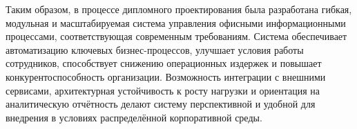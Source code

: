 Таким образом, в процессе дипломного проектирования была разработана гибкая, модульная и масштабируемая система управления офисными информационными процессами, соответствующая современным требованиям. Система обеспечивает автоматизацию ключевых бизнес-процессов, улучшает условия работы сотрудников, способствует снижению операционных издержек и повышает конкурентоспособность организации. Возможность интеграции с внешними сервисами, архитектурная устойчивость к росту нагрузки и ориентация на аналитическую отчётность делают систему перспективной и удобной для внедрения в условиях распределённой корпоративной среды.
